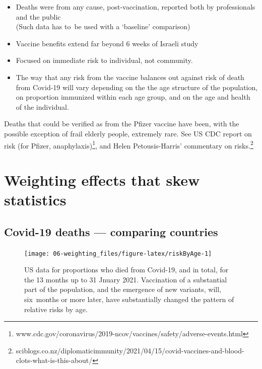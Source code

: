 \documentclass[
  10pt,
  b5paper]{book}
\providecommand{\tightlist}{%
  \setlength{\itemsep}{0pt}\setlength{\parskip}{0pt}}
\begin{document}
\begin{itemize}
\tightlist
\item
  Deaths were from any cause, post-vaccination, reported both by
  professionals and the public\\
  (Such data has to~be used with a `baseline' comparison)
\item
  Vaccine benefits extend far beyond 6 weeks of Israeli study
\item
  Focused on immediate risk to individual, not community.
\item
  The way that any risk from the vaccine balances out against
  risk of death from Covid-19 will vary depending on the the age
  structure of the population, on proportion immunized within
  each age group, and on the age and health of the individual.
\end{itemize}

Deaths that could be verified as from the Pfizer vaccine have been,
with the possible exception of frail elderly people, extremely rare.
See US CDC report on risk (for Pfizer, anaphylaxis)\footnote{www.cdc.gov/coronavirus/2019-ncov/vaccines/safety/adverse-events.html},
and Helen Petousis-Harris' commentary on risks.\footnote{sciblogs.co.nz/diplomaticimmunity/2021/04/15/covid-vaccines-and-blood-clots-what-is-this-about/}

\hypertarget{sec:yule1}{%
\chapter{Weighting effects that skew statistics}\label{sec:yule1}}

\hypertarget{covid-19-deaths-comparing-countries}{%
\section{Covid-19 deaths --- comparing countries}\label{covid-19-deaths-comparing-countries}}

\begin{figure}[H]

{\centering \texttt{[image: 06-weighting\_files/figure-latex/riskByAge-1]} 

}

\caption{US data for proportions who died from Covid-19, and in total,
for the 13 months up to 31 Jnuary 2021. Vaccination of a substantial 
part of the population, and the emergence of new variants, will,
six months or more later, have substantially changed the pattern
of relative risks by age.}\label{fig:riskByAge}
\end{figure}
\end{document}
